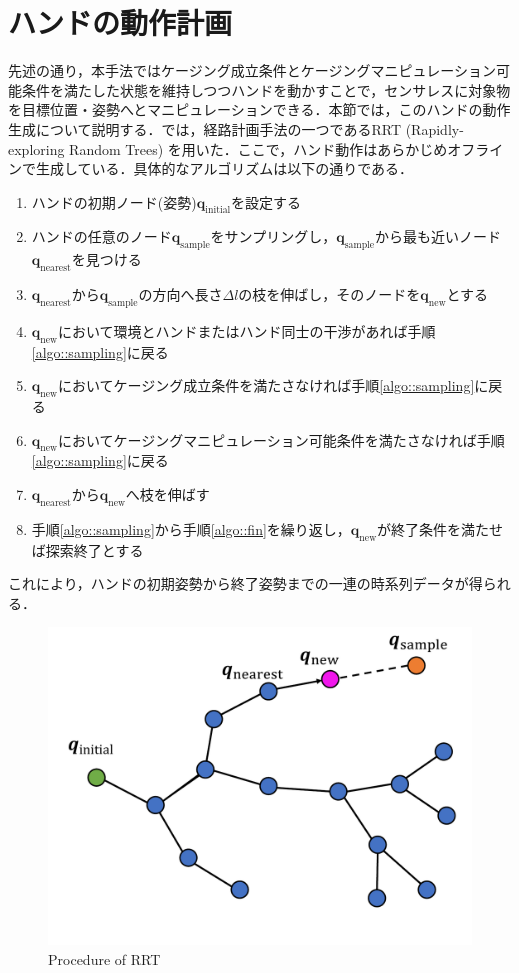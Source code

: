 \documentclass[a4paper,twoside,12pt,papersize, dvipdfmx]{iirthesis}
\begin{document}
\section{ハンドの動作計画\cite{komiyama2021}}\label{sec::sicm::planning}
先述の通り，本手法ではケージング成立条件とケージングマニピュレーション可能条件を満たした状態を維持しつつハンドを動かすことで，センサレスに対象物を目標位置・姿勢へとマニピュレーションできる．本節では，このハンドの動作生成について説明する．\cite{komiyama2021}では，経路計画手法の一つであるRRT (Rapidly-exploring Random Trees) \cite{lavalle2001}を用いた．ここで，ハンド動作はあらかじめオフラインで生成している．具体的なアルゴリズムは以下の通りである．
\begin{enumerate}
\item ハンドの初期ノード(姿勢)$\bm{q}_{\mathrm{initial}}$を設定する
\item ハンドの任意のノード$\bm{q}_{\mathrm{sample}}$をサンプリングし，$\bm{q}_{\mathrm{sample}}$から最も近いノード$\bm{q}_{\mathrm{nearest}}$を見つける\label{algo::sampling}
\item $\bm{q}_{\mathrm{nearest}}$から$\bm{q}_{\mathrm{sample}}$の方向へ長さ$\Delta l$の枝を伸ばし，そのノードを$\bm{q}_{\mathrm{new}}$とする
\item $\bm{q}_{\mathrm{new}}$において環境とハンドまたはハンド同士の干渉があれば手順\ref{algo::sampling}に戻る
\item $\bm{q}_{\mathrm{new}}$においてケージング成立条件を満たさなければ手順\ref{algo::sampling}に戻る
\item $\bm{q}_{\mathrm{new}}$においてケージングマニピュレーション可能条件を満たさなければ手順\ref{algo::sampling}に戻る
\item $\bm{q}_{\mathrm{nearest}}$から$\bm{q}_{\mathrm{new}}$へ枝を伸ばす\label{algo::fin}
\item 手順\ref{algo::sampling}から手順\ref{algo::fin}を繰り返し，$\bm{q}_{\mathrm{new}}$が終了条件を満たせば探索終了とする \label{algo::goal}
\end{enumerate}
これにより，ハンドの初期姿勢から終了姿勢までの一連の時系列データが得られる．
\begin{figure}[b]
\centering
\includegraphics[width=0.5\hsize]{fig/2-sensorless-icm/rrtdiagram.pdf}
\caption{Procedure of RRT \cite{komiyama2021}}
\label{fig::sicm::rrt}
\end{figure}
\end{document}
